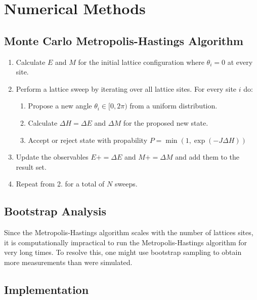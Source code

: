 \section{Numerical Methods}
\subsection{Monte Carlo Metropolis-Hastings Algorithm}

\begin{enumerate}
	\item Calculate $E$ and $M$ for the initial lattice configuration where $\theta_i = 0$ at every site.
	\item Perform a lattice sweep by iterating over all lattice sites. For every site $i$ do:
	\begin{enumerate}
		\item Propose a new angle $\theta_i \in [0,2\pi)$ from a uniform distribution.
		\item Calculate $\Delta H = \Delta E$ and $\Delta M$ for the proposed new state.
		\item Accept or reject state with propability $P = \min{(1, \exp{(-J\Delta H)})}$
	\end{enumerate}
	\item Update the observables $E \mathrel{{+}{=}} \Delta E$ and $M \mathrel{{+}{=}} \Delta M$ and add them to the result set.
	\item Repeat from 2. for a total of $N$ sweeps.
\end{enumerate}

\subsection{Bootstrap Analysis}
Since the Metropolis-Hastings algorithm scales with the number of lattices sites, it is computationally impractical to run the Metropolis-Hastings algorithm for very long times. To resolve this, one might use bootstrap sampling to obtain more measurements than were simulated. 

\subsection{Implementation}